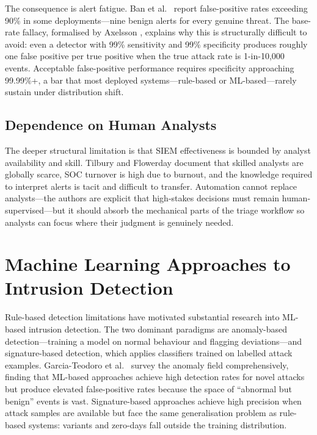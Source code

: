 The consequence is alert fatigue. Ban et al.\ \cite{ban2023alertfatigue} report false-positive rates exceeding 90\% in some deployments---nine benign alerts for every genuine threat. The base-rate fallacy, formalised by Axelsson \cite{axelsson2000baseratev}, explains why this is structurally difficult to avoid: even a detector with 99\% sensitivity and 99\% specificity produces roughly one false positive per true positive when the true attack rate is 1-in-10,000 events. Acceptable false-positive performance requires specificity approaching 99.99\%+, a bar that most deployed systems---rule-based or ML-based---rarely sustain under distribution shift.

\subsection{Dependence on Human Analysts}

The deeper structural limitation is that SIEM effectiveness is bounded by analyst availability and skill. Tilbury and Flowerday \cite{tilbury2024humans} document that skilled analysts are globally scarce, SOC turnover is high due to burnout, and the knowledge required to interpret alerts is tacit and difficult to transfer. Automation cannot replace analysts---the authors are explicit that high-stakes decisions must remain human-supervised---but it should absorb the mechanical parts of the triage workflow so analysts can focus where their judgment is genuinely needed.

\section{Machine Learning Approaches to Intrusion Detection}

Rule-based detection limitations have motivated substantial research into ML-based intrusion detection. The two dominant paradigms are anomaly-based detection---training a model on normal behaviour and flagging deviations---and signature-based detection, which applies classifiers trained on labelled attack examples. Garcia-Teodoro et al.\ \cite{garcia2009anomaly} survey the anomaly field comprehensively, finding that ML-based approaches achieve high detection rates for novel attacks but produce elevated false-positive rates because the space of ``abnormal but benign'' events is vast. Signature-based approaches achieve high precision when attack samples are available but face the same generalisation problem as rule-based systems: variants and zero-days fall outside the training distribution.

